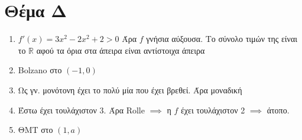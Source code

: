\documentclass[12pt]{article}
\begin{document}
\section*{Θέμα Δ}
  \noindent
  \begin{enumerate}
    \item $f'(x)=3x^2-2x^2+2 > 0$ Άρα $f$ γνήσια αύξουσα. Το σύνολο τιμών της είναι το $\mathbb{R}$ αφού τα όρια στα άπειρα είναι αντίστοιχα άπειρα
    \item Bolzano στο $(-1,0)$
    \item Ως γν. μονότονη έχει το πολύ μία που έχει βρεθεί. Άρα μοναδική
    \item Έστω έχει τουλάχιστον 3. Άρα Rolle $\implies$ η $f$ έχει τουλάχιστον 2 $\implies$ άτοπο.
    \item ΘΜΤ στο $(1,a)$
  \end{enumerate}
\end{document}
